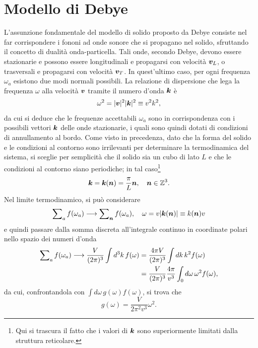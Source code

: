 \section{Modello di Debye}
L'assunzione fondamentale del modello di solido proposto da Debye consiste nel far corrispondere i fononi ad onde sonore che si propagano nel solido, sfruttando il concetto di dualità onda-particella. Tali onde, secondo Debye, devono essere stazionarie e possono essere longitudinali e propagarsi con velocità $\bm{v}_L$, o trasversali e propagarsi con velocità $\bm{v}_T$. In quest'ultimo caso, per ogni frequenza $\omega_a$ esistono due modi normali possibili. La relazione di dispersione che lega la frequenza $\omega$ alla velocità $\bm{v}$ tramite il numero d'onda $\bm{k}$ è
\begin{equation}
    \omega^2 = |\bm{v}|^2|\bm{k}|^2 \equiv v^2k^2,
\end{equation}
da cui si deduce che le frequenze accettabili $\omega_a$ sono in corrispondenza con i possibili vettori $\bm{k}$ delle onde stazionarie, i quali sono quindi dotati di condizioni di annullamento al bordo. Come visto in precedenza, dato che la forma del solido e le condizioni al contorno sono irrilevanti per determinare la termodinamica del sistema, si sceglie per semplicità che il solido sia un cubo di lato $L$ e che le condizioni al contorno siano periodiche; in tal caso\footnote{Qui si trascura il fatto che i valori di $\bm{k}$ sono superiormente limitati dalla struttura reticolare.}
\begin{equation}
    \bm{k} = \bm{k}(\bm{n}) = \frac{\pi}{L}\bm{n},\quad \bm{n}\in\mathbb{Z}^3.
\end{equation}
Nel limite termodinamico, si può considerare
\begin{equation}
    \sum\nolimits_af(\omega_a) \longrightarrow \sum\nolimits_{\bm{n}} f(\omega_a),\quad \omega = v|\bm{k}(\bm{n})| \equiv k(\bm{n})v
\end{equation}
e quindi passare dalla somma discreta all'integrale continuo in coordinate polari nello spazio dei numeri d'onda
\begin{equation}
    \begin{split}
        \sum\nolimits_af(\omega_a) \longrightarrow \frac{V}{(2\pi)^3}\int d^3k\,f(\omega) &= \frac{4\pi V}{(2\pi)^3}\int dk\,k^2f(\omega) \\
        &= \frac{V}{(2\pi)^3}\frac{4\pi}{v^3}\int_0d\omega\,\omega^2 f(\omega),
    \end{split}
\end{equation}
da cui, confrontandola con $\int d\omega\,g(\omega)f(\omega)$, si trova che 
\begin{equation}
    g(\omega) = \frac{V}{2\pi^2v^3}\omega^2.
\end{equation}
